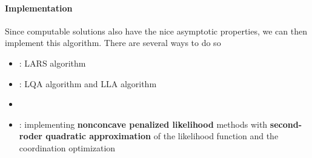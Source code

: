 \documentclass[twoside]{article}
\begin{document}
\paragraph*{Implementation} Since computable solutions also have the nice asymptotic properties, we can then implement this algorithm. There are several ways to do so 
\begin{itemize}
    \item {}: LARS algorithm \citep{efron2004least}
    \item {}: LQA algorithm \citep{fan2001variable} and LLA algorithm \citep{zou2008one}
    \item {} \citep{wu2008coordinate}
    \item {}: implementing \textbf{nonconcave penalized likelihood} methods with \textbf{second-roder quadratic approximation} of the likelihood function and the coordination optimization \citep{fan2011nonconcave}
\end{itemize}

\newpage


\end{document}
